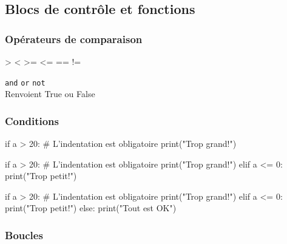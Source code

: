 \documentclass{beamer}
\let\oldsubsubsection\subsubsection
\renewcommand{\subsubsection}[2][]{\def\currentsubsubsection{#2}\oldsubsubsection[#1]{#2}}
\begin{document}
\subsection{Blocs de contrôle et fonctions}

\subsubsection{Opérateurs de comparaison}

\begin{code}{\codebox}
>   <   >=   <=   ==   !=
\end{code}
\begin{frame}
  \usebox\codebox

  \lstinline{and} \quad \lstinline{or} \quad \lstinline{not}\\[0.5cm]
  
  Renvoient True ou False
\end{frame}

\subsubsection{Conditions}

\begin{code}{\codeboxa}
if a > 20:
    # L'indentation est obligatoire
    print("Trop grand!")
\end{code}
\begin{code}{\codeboxb}
if a > 20:
    # L'indentation est obligatoire
    print("Trop grand!")
elif a <= 0:
    print("Trop petit!")
\end{code}
\begin{code}{\codeboxc}
if a > 20:
    # L'indentation est obligatoire
    print("Trop grand!")
elif a <= 0:
    print("Trop petit!")
else:
    print("Tout est OK")
\end{code}
\begin{frame}
    \begin{overprint}
    \usebox\codeboxa
    \usebox\codeboxb
    \usebox\codeboxc
    \end{overprint}
\end{frame}

\subsubsection{Boucles}
\end{document}
